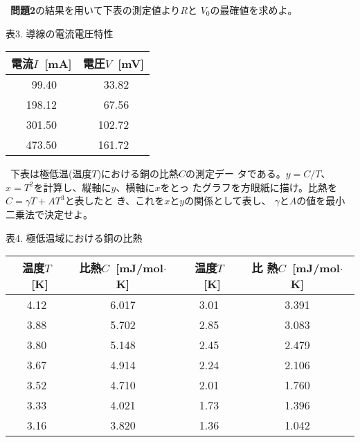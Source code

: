 \documentclass[11pt,a4,epsf]{jarticle}
\begin{document}

\noindent {\bf [問題9]}~{\bf 問題2}の結果を用いて下表の測定値より$R$と
$V_0$の最確値を求めよ。

\begin{center}

表3. 導線の電流電圧特性

\vspace{0.2cm}
\begin{tabular}{|c|c|} \hline
電流$I$~[mA] & 電圧$V$~[mV] \\ \hline
~99.40   & ~33.82    \\ \hline
198.12   & ~67.56    \\ \hline
301.50   & 102.72    \\ \hline
473.50   & 161.72    \\ \hline
\end{tabular}

\end{center}


\bigskip

\noindent {\bf [問題10]}~下表は極低温(温度$T$)における銅の比熱$C$の測定デー
タである。$y=C/T$、$x=T^2$を計算し、縦軸に$y$、横軸に$x$をとっ
たグラフを方眼紙に描け。比熱を $C=\gamma T + AT^3$と表したと
き、これを$x$と$y$の関係として表し、
$\gamma$と$A$の値を最小二乗法で決定せよ。

\begin{center}

表4. 極低温域における銅の比熱

\vspace{0.2cm}
\begin{tabular}{||c|c||c|c||} \hline
温度$T$~[K] & 比熱$C$~[mJ/mol$\cdot$K] & 温度$T$~[K] & 比 
熱$C$~[mJ/mol$\cdot$K]\\ \hline
4.12   &  6.017  &  3.01  &  3.391 \\ \hline
3.88   &  5.702  &  2.85  &  3.083 \\ \hline
3.80   &  5.148  &  2.45  &  2.479 \\ \hline
3.67   &  4.914  &  2.24  &  2.106 \\ \hline
3.52   &  4.710  &  2.01  &  1.760 \\ \hline
3.33   &  4.021  &  1.73  &  1.396 \\ \hline
3.16   &  3.820  &  1.36  &  1.042 \\ \hline
\end{tabular}

\end{center}
\end{document}

